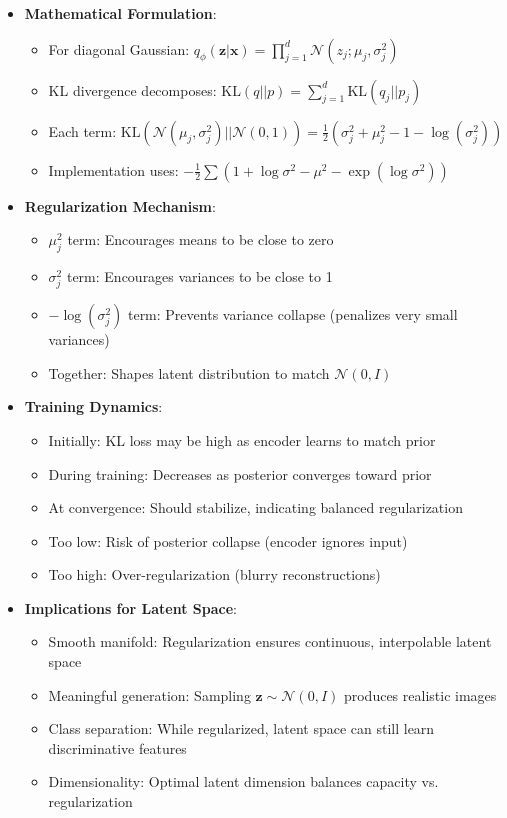 \documentclass[conference]{IEEEtran}
\newcommand{\logvar}{\log \sigma^2}
\begin{document}
\begin{itemize}
    \item \textbf{Mathematical Formulation}:
    \begin{itemize}
        \item For diagonal Gaussian: $q_\phi(\mathbf{z}|\mathbf{x}) = \prod_{j=1}^{d} \mathcal{N}(z_j; \mu_j, \sigma_j^2)$
        \item KL divergence decomposes: $\text{KL}(q||p) = \sum_{j=1}^{d} \text{KL}(q_j||p_j)$
        \item Each term: $\text{KL}(\mathcal{N}(\mu_j, \sigma_j^2) || \mathcal{N}(0, 1)) = \frac{1}{2}(\sigma_j^2 + \mu_j^2 - 1 - \log(\sigma_j^2))$
        \item Implementation uses: $-\frac{1}{2}\sum(1 + \logvar - \mu^2 - \exp(\logvar))$
    \end{itemize}
    
    \item \textbf{Regularization Mechanism}:
    \begin{itemize}
        \item $\mu_j^2$ term: Encourages means to be close to zero
        \item $\sigma_j^2$ term: Encourages variances to be close to 1
        \item $-\log(\sigma_j^2)$ term: Prevents variance collapse (penalizes very small variances)
        \item Together: Shapes latent distribution to match $\mathcal{N}(0, I)$
    \end{itemize}
    
    \item \textbf{Training Dynamics}:
    \begin{itemize}
        \item Initially: KL loss may be high as encoder learns to match prior
        \item During training: Decreases as posterior converges toward prior
        \item At convergence: Should stabilize, indicating balanced regularization
        \item Too low: Risk of posterior collapse (encoder ignores input)
        \item Too high: Over-regularization (blurry reconstructions)
    \end{itemize}
    
    \item \textbf{Implications for Latent Space}:
    \begin{itemize}
        \item Smooth manifold: Regularization ensures continuous, interpolable latent space
        \item Meaningful generation: Sampling $\mathbf{z} \sim \mathcal{N}(0, I)$ produces realistic images
        \item Class separation: While regularized, latent space can still learn discriminative features
        \item Dimensionality: Optimal latent dimension balances capacity vs. regularization
    \end{itemize}
\end{itemize}
\end{document}
